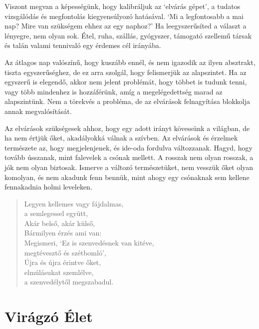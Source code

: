 
Viszont megvan a képességünk, hogy kalibráljuk az `elvárás gépet', a
tudatos vizsgálódás és megfontolás kiegyensúlyozó hatásával. `Mi a
legfontosabb a mai nap? Mire van szükségem ehhez az egy naphoz?' Ha
leegyszerűsíted a választ a lényegre, nem olyan sok. Étel, ruha,
szállás, gyógyszer, támogató szellemű társak és talán valami tennivaló
egy érdemes cél irányába.

Az átlagos nap valószínű, hogy kuszább ennél, és nem igazodik az ilyen
absztrakt, tiszta egyszerűséghez, de ez arra szolgál, hogy felismerjük
az alapszintet. Ha az egyszerű is elegendő, akkor nem jelent problémát,
hogy többet is tudunk tenni, vagy több mindenhez is hozzáférünk, amíg a
megelégedettség marad az alapszintünk. Nem a törekvés a probléma, de az
elvárások felnagyítása blokkolja annak megvalósítását.

Az elvárások szükségesek ahhoz, hogy egy adott irányt kövessünk a
világban, de ha nem értjük őket, akadályokká válnak a szívben. Az
elvárások és érzelmek természete az, hogy megjelenjenek, és ide-oda
fordulva változzanak. Hagyd, hogy tovább ússzanak, mint falevelek a
csónak mellett. A rosszak nem olyan rosszak, a jók nem olyan biztosak.
Ismerve a változó természetüket, nem vesszük őket olyan komolyan, és nem
akadunk fenn bennük, mint ahogy egy csónaknak sem kellene fennakadnia
holmi leveleken.

\begin{quote}
Legyen kellemes vagy fájdalmas,\\
a semlegessel együtt,\\
Akár belső, akár külső,\\
Bármilyen érzés ami van:\\
Megismeri, `Ez is szenvedésnek van kitéve,\\
megtévesztő és szétbomló',\\
Újra és újra érintve őket,\\
elmúlásukat szemlélve,\\
a szenvedélytől megszabadul.

\bigskip

\end{quote}

\section{Virágzó Élet}

